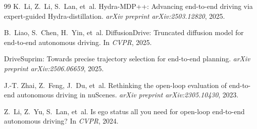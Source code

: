 \documentclass[addpoints]{exam}
\begin{document}
\begin{thebibliography}{99}
    K.~Li, Z.~Li, S.~Lan, et~al.
    \newblock Hydra-MDP++: Advancing end-to-end driving via expert-guided
    Hydra-distillation.
    \newblock \emph{arXiv preprint arXiv:2503.12820}, 2025.

    B.~Liao, S.~Chen, H.~Yin, et~al.
    \newblock DiffusionDrive: Truncated diffusion model for end-to-end
    autonomous driving.
    \newblock In \emph{CVPR}, 2025.

    DriveSuprim: Towards precise trajectory selection for end-to-end planning.
    \newblock \emph{arXiv preprint arXiv:2506.06659}, 2025.

    J.-T. Zhai, Z.~Feng, J.~Du, et~al.
    \newblock Rethinking the open-loop evaluation of end-to-end autonomous
    driving in nuScenes.
    \newblock \emph{arXiv preprint arXiv:2305.10430}, 2023.

    Z.~Li, Z.~Yu, S.~Lan, et~al.
    \newblock Is ego status all you need for open-loop end-to-end autonomous
    driving?
    \newblock In \emph{CVPR}, 2024.

    \end{thebibliography}
\end{document}
